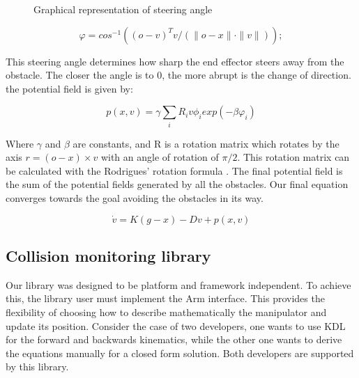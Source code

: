 \documentclass[a4paper, 10pt, conference]{ieeeconf}      %
\begin{document}
\begin{figure}
	\centering
	\caption{Graphical representation of steering angle \cite{1}}
	\label{steering_image}
\end{figure}

\begin{equation} \label{eq:2}
	\varphi = cos^{-1} ((o-v)^T v / (\|o-x\| \cdot \|v\|));
\end{equation}

This steering angle determines how sharp the end effector steers away from the obstacle. The closer the angle is to 0, the more abrupt is the change of direction. the potential field is given by:

\begin{equation}
	p(x, v) = \gamma \sum_i R_i v \phi_i exp(-\beta \varphi_i) 
\end{equation}

Where $\gamma$ and $\beta$ are constants, and R is a rotation matrix which rotates by the axis $r = (o-x) \times v $ with an angle of rotation of $\pi/2$. This rotation matrix can be calculated with the Rodrigues' rotation formula \cite{rodrigues}. The final potential field is the sum of the potential fields generated by all the obstacles. Our final equation converges towards the goal avoiding the obstacles in its way.

\begin{equation}
\dot{v} = K ( g - x ) - D v + p(x, v)
\end{equation}

\subsection{Collision monitoring library} %

Our library was designed to be platform and framework independent. To achieve this, the library user must implement the Arm interface. This provides the flexibility of choosing how to describe mathematically the manipulator and update its position. Consider the case of two developers, one wants to use KDL for the forward and backwards kinematics, while the other one wants to derive the equations manually for a closed form solution. Both developers are supported by this library. 
\end{document}

